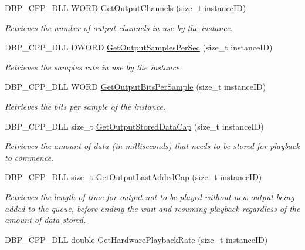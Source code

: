 \begin{DoxyCompactItemize}
DBP\_\-CPP\_\-DLL WORD \hyperlink{namespacemn_sound_ad071cba851fd76ecd0672761511d6b2f}{GetOutputChannels} (size\_\-t instanceID)
\begin{DoxyCompactList}\small\item\em Retrieves the number of output channels in use by the instance. \item\end{DoxyCompactList}\item 
DBP\_\-CPP\_\-DLL DWORD \hyperlink{namespacemn_sound_a220cb803f0b02b9b30c4dacf728d2971}{GetOutputSamplesPerSec} (size\_\-t instanceID)
\begin{DoxyCompactList}\small\item\em Retrieves the samples rate in use by the instance. \item\end{DoxyCompactList}\item 
DBP\_\-CPP\_\-DLL WORD \hyperlink{namespacemn_sound_ad1c20b2f6eee23460deebba18c960f6c}{GetOutputBitsPerSample} (size\_\-t instanceID)
\begin{DoxyCompactList}\small\item\em Retrieves the bits per sample of the instance. \item\end{DoxyCompactList}\item 
DBP\_\-CPP\_\-DLL size\_\-t \hyperlink{namespacemn_sound_a63c6c26666fcc777b392142bef99a4e4}{GetOutputStoredDataCap} (size\_\-t instanceID)
\begin{DoxyCompactList}\small\item\em Retrieves the amount of data (in milliseconds) that needs to be stored for playback to commence. \item\end{DoxyCompactList}\item 
DBP\_\-CPP\_\-DLL size\_\-t \hyperlink{namespacemn_sound_a46ed2d03831f3a72a6fa717612173cd0}{GetOutputLastAddedCap} (size\_\-t instanceID)
\begin{DoxyCompactList}\small\item\em Retrieves the length of time for output not to be played without new output being added to the queue, before ending the wait and resuming playback regardless of the amount of data stored. \item\end{DoxyCompactList}\item 
DBP\_\-CPP\_\-DLL double \hyperlink{namespacemn_sound_ac09ccc78d0e9e878962be45eb1f8c532}{GetHardwarePlaybackRate} (size\_\-t instanceID)

\end{DoxyCompactItemize}
